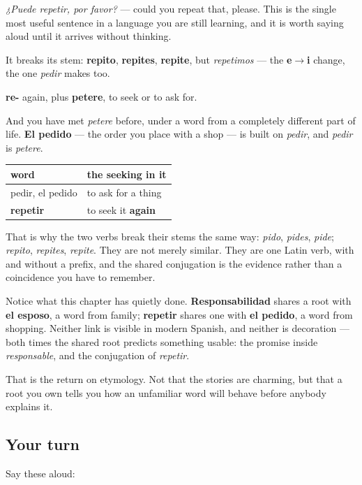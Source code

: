 \emph{¿Puede repetir, por favor?} — could you repeat that, please. This is the single most useful sentence in a language you are still learning, and it is worth saying aloud until it arrives without thinking.

It breaks its stem: \textbf{repito}, \textbf{repites}, \textbf{repite}, but \emph{repetimos} — the \textbf{e$\to$i} change, the one \emph{pedir} makes too.

\begin{cousinweb}
\textbf{re-} again, plus \textbf{petere}, to seek or to ask for.

And you have met \emph{petere} before, under a word from a completely different part of life. \textbf{El pedido} — the order you place with a shop — is built on \emph{pedir}, and \emph{pedir} is \emph{petere}.

\noindent
\begin{tabularx}{\linewidth}{@{}>{\raggedright\arraybackslash}X>{\raggedright\arraybackslash}X@{}}
\toprule
\textbf{word} & \textbf{the seeking in it} \\
\midrule
pedir, el pedido & to ask for a thing \\
\textbf{repetir} & to seek it \textbf{again} \\
\bottomrule
\end{tabularx}

That is why the two verbs break their stems the same way: \emph{pido}, \emph{pides}, \emph{pide}; \emph{repito}, \emph{repites}, \emph{repite}. They are not merely similar. They are one Latin verb, with and without a prefix, and the shared conjugation is the evidence rather than a coincidence you have to remember.
\end{cousinweb}

\begin{culture}
Notice what this chapter has quietly done. \textbf{Responsabilidad} shares a root with \textbf{el esposo}, a word from family; \textbf{repetir} shares one with \textbf{el pedido}, a word from shopping. Neither link is visible in modern Spanish, and neither is decoration — both times the shared root predicts something usable: the promise inside \emph{responsable}, and the conjugation of \emph{repetir}.

That is the return on etymology. Not that the stories are charming, but that a root you own tells you how an unfamiliar word will behave before anybody explains it.
\end{culture}

\subsection*{Your turn}
Say these aloud:

